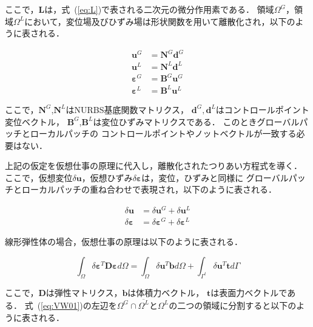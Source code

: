 \noindent
ここで，$\boldsymbol{L}$は，式~(\ref{eq:L})で表される二次元の微分作用素である．
領域$\Omega^G$，領域$\Omega^L$において，変位場及びひずみ場は形状関数を用いて離散化され，以下のように表される．

\begin{eqnarray}
  \boldsymbol{u}^G&=\boldsymbol{N}^G\boldsymbol{d}^G\\
  \boldsymbol{u}^L&=\boldsymbol{N}^L\boldsymbol{d}^L\\
  \boldsymbol{\varepsilon}^G&=\boldsymbol{B}^G\boldsymbol{u}^G\\
  \boldsymbol{\varepsilon}^L&=\boldsymbol{B}^L\boldsymbol{u}^L
\end{eqnarray}

\noindent
ここで，$\boldsymbol{N}^G$,$\boldsymbol{N}^L$はNURBS基底関数マトリクス，
$\boldsymbol{d}^G,\boldsymbol{d}^L$はコントロールポイント変位ベクトル，
$\boldsymbol{B}^G$,$\boldsymbol{B}^L$は変位ひずみマトリクスである．
このときグローバルパッチとローカルパッチの
コントロールポイントやノットベクトルが一致する必要はない．

上記の仮定を仮想仕事の原理に代入し，離散化されたつりあい方程式を導く．
ここで，仮想変位$\delta \boldsymbol{u}$，仮想ひずみ$\delta \boldsymbol{\varepsilon}$は，変位，ひずみと同様に
グローバルパッチとローカルパッチの重ね合わせで表現され，以下のように表される．

\begin{align}
  \delta \boldsymbol{u} &= \delta \boldsymbol{u}^G + \delta \boldsymbol{u}^L\\
  \delta \boldsymbol{\varepsilon} &= \delta \boldsymbol{\varepsilon}^G + \delta \boldsymbol{\varepsilon}^L
\end{align}

\noindent
線形弾性体の場合，仮想仕事の原理は以下のように表される．

\begin{equation}
  \label{eq:VW01}
  \int_\Omega \delta \boldsymbol{\varepsilon}^T \boldsymbol{D} \boldsymbol{\varepsilon} d\Omega
  = \int_\Omega \delta \boldsymbol{u}^T \boldsymbol{b} d\Omega + \int_{\Gamma^t} \delta \boldsymbol{u}^T \boldsymbol{t} d\Gamma
\end{equation}

\noindent
ここで，$\boldsymbol{D}$は弾性マトリクス，$\boldsymbol{b}$は体積力ベクトル，
$\boldsymbol{t}$は表面力ベクトルである．
式~(\ref{eq:VW01})の左辺を$\Omega^G\cap\overline{\Omega^L}$と$\Omega^L$の二つの領域に分割すると以下のように表される．


